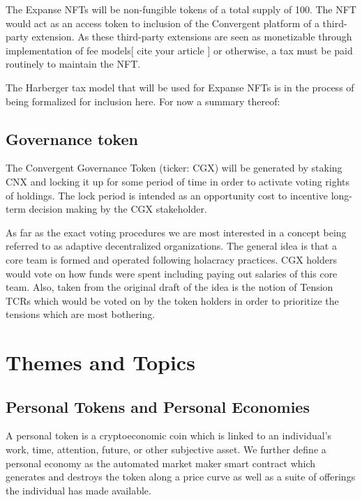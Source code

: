 \documentclass[a4paper, 10pt]{article}
\begin{document}
The Expanse NFTs will be non-fungible tokens of a total supply of 100. The NFT would act as an access token to inclusion of the Convergent platform of a third-party extension. As these third-party extensions are seen as monetizable through implementation of fee models[ cite your article ] or otherwise, a tax must be paid routinely to maintain the NFT.

The Harberger tax model that will be used for Expanse NFTs is in the process of being formalized for inclusion here. For now a summary thereof: 

\subsection{Governance token}

The Convergent Governance Token (ticker: CGX) will be generated by staking CNX and locking it up for some period of time in order to activate voting rights of holdings. The lock period is intended as an opportunity cost to incentive long-term decision making by the CGX stakeholder. 

As far as the exact voting procedures we are most interested in a concept being referred to as adaptive decentralized organizations. The general idea is that a core team is formed and operated following holacracy practices. CGX holders would vote on how funds were spent including paying out salaries of this core team. Also, taken from the original draft of the idea is the notion of Tension TCRs which would be voted on by the token holders in order to prioritize the tensions which are most bothering.

\section{Themes and Topics}

\subsection{Personal Tokens and Personal Economies}

A personal token is a cryptoeconomic coin which is linked to an individual’s work, time, attention, future, or other subjective asset. We further define a personal economy as the automated market maker smart contract which generates and destroys the token along a price curve as well as a suite of offerings the individual has made available. 
\end{document}
